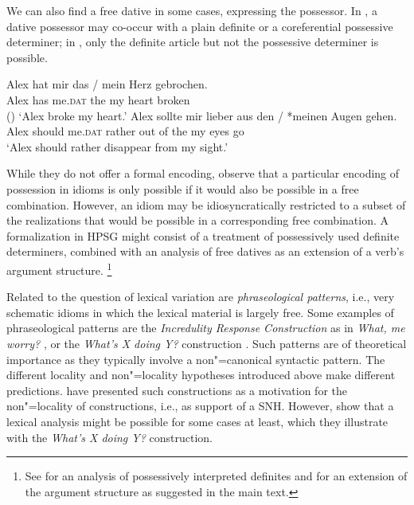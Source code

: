 \documentclass[output=paper,biblatex,babelshorthands,newtxmath,draftmode,colorlinks,citecolor=brown]{langscibook}
\begin{document}
\noindent
We can also find a free dative in some cases, expressing the possessor.  In , a
dative possessor may co-occur with a plain definite or a coreferential possessive determiner; in
, only the definite article but not the possessive determiner is possible.


\eal
\label{ex-herz-augen}
\ex 
\gll Alex hat mir das / mein Herz gebrochen.\\
Alex has me.\textsc{dat} the {} my heart broken\\\hfill()
\glt `Alex broke my heart.'\label{ex-herz}
\ex 
\gll Alex sollte mir lieber aus den / *meinen Augen gehen.\\
Alex should me.\textsc{dat} rather {out of} the {} \hphantom{*}my eyes go\\
\glt `Alex should rather disappear from my sight.'\label{ex-augen}
\zl 

\noindent
While they do not offer a formal encoding, \citet{Markantonatou:Sailer:16} observe that a particular
encoding of possession in idioms is only possible if it would also be possible in a free
combination. However, an idiom may be idiosyncratically restricted to a subset of the realizations
that would be possible in a corresponding free combination. A formalization in HPSG might consist of
a treatment of possessively used definite determiners, combined with an analysis of free datives as
an extension of a verb's argument structure.%
\footnote{See  for an analysis of possessively interpreted definites and
   for an extension of the argument structure as suggested in the main
  text.
}

Related to the question of lexical variation are \emph{phraseological
  patterns}, i.e., very schematic idioms in which the lexical material is largely free. Some
examples of phraseological patterns are the \emph{Incredulity Response Construction} as in
\emph{What, me worry?} \citep{Akmajian:84,Lambrecht:90}, or the \emph{What's X doing Y?}
construction \citep{KF99a}.  Such patterns are of theoretical importance as they typically involve a
non"=canonical syntactic pattern.  The different locality and non"=locality hypotheses introduced
above make different predictions.  \citet{FKoC88a} have presented such constructions as a motivation
for the non"=locality of constructions, i.e., as support of a SNH. However, \citet{KF99a} show that
a lexical analysis might be possible for some cases at least, which they illustrate with the
\emph{What's X doing Y?} construction.
\end{document}
